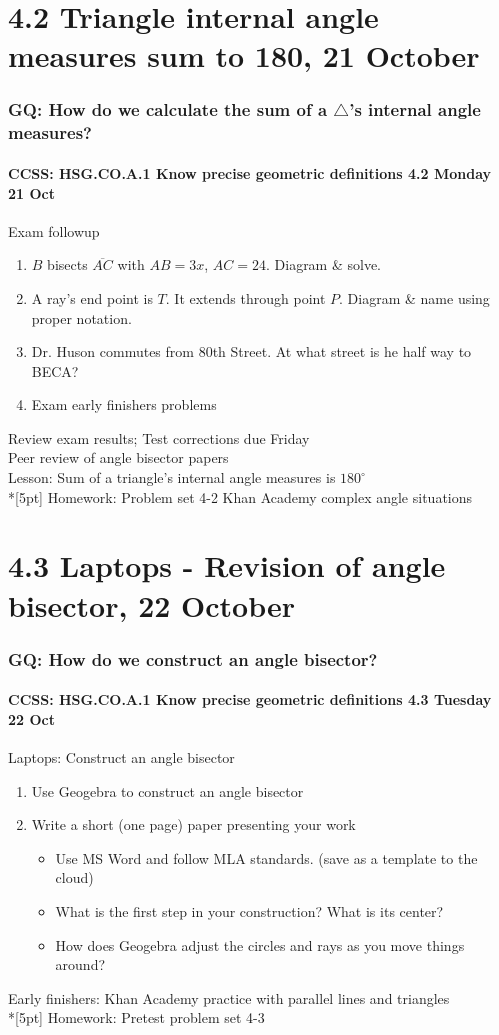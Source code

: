 \documentclass{beamer}
\begin{document}
\section{4.2 Triangle internal angle measures sum to 180, 21 October}
  \frame
  {
    \frametitle{GQ: How do we calculate the sum of a $\triangle$'s internal angle measures?}
    \framesubtitle{CCSS: HSG.CO.A.1 Know precise geometric definitions \hfill \alert{4.2 Monday 21 Oct}}

    \begin{block}{Exam followup}
    \begin{enumerate}
      \item $B$ bisects $\overline{AC}$ with $AB=3x$, $AC=24$. Diagram \& solve.
      \item A ray's end point is $T$. It extends through point $P$. Diagram \& name using proper notation.
      \item Dr. Huson commutes from 80th Street. At what street is he half way to BECA?
      \item Exam early finishers problems
    \end{enumerate}
    \end{block}
    Review exam results; Test corrections due \alert{Friday}\\
    Peer review of angle bisector papers \\
    Lesson: Sum of a triangle's internal angle measures is $180^\circ$ \\*[5pt]
    Homework: Problem set 4-2 Khan Academy complex angle situations
  }

\section{4.3 Laptops - Revision of angle bisector, 22 October}
  \frame
  {
    \frametitle{GQ: How do we construct an angle bisector?}
    \framesubtitle{CCSS: HSG.CO.A.1 Know precise geometric definitions \hfill \alert{4.3 Tuesday 22 Oct}}

    \begin{block}{Laptops: Construct an angle bisector}
    \begin{enumerate}
      \item Use Geogebra to construct an angle bisector
      \item Write a short (one page) paper presenting your work
      \begin{itemize}
        \item Use MS Word and follow MLA standards. (save as a template to the cloud)
        \item What is the first step in your construction? What is its center?
        \item How does Geogebra adjust the circles and rays as you move things around?
      \end{itemize}
    \end{enumerate}
    \end{block}
    Early finishers:  Khan Academy practice with parallel lines and triangles \\*[5pt]
    Homework: Pretest problem set 4-3
  }
\end{document}
